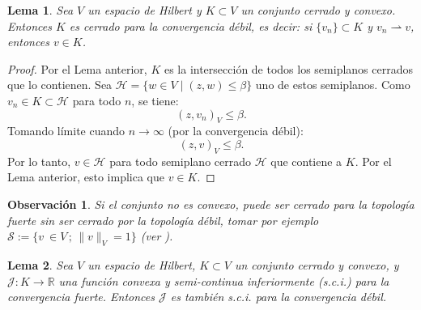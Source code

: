 \documentclass[12pt]{book}
\newtheorem{lemma}{Lema}
\newtheorem{remark}{Observación}
\theoremstyle{definition}
\theoremstyle{plain}
\theoremstyle{remark}
\begin{document}
%

\begin{lemma}
    Sea \(V\) un espacio de Hilbert y \(K \subset V\) un conjunto cerrado y convexo. Entonces \(K\) es cerrado para la convergencia débil, es decir:
    si \(\{v_n\} \subset K\) y \(v_n \rightharpoonup v\), entonces \(v \in K\).
\end{lemma}

\begin{proof}
Por el Lema anterior, \(K\) es la intersección de todos los semiplanos cerrados que lo contienen. Sea \(\mathcal{H} = \{ w \in V \mid (z,w) \leq \beta \}\) uno de estos semiplanos. Como \(v_n \in K \subset \mathcal{H}\) para todo \(n\), se tiene:
  \[
  ( z , v_n )_V \leq \beta.
  \]
  Tomando límite cuando \(n \to \infty\) (por la convergencia débil):
  \[
    ( z , v )_V
 \leq \beta.
  \]
  Por lo tanto, \(v \in \mathcal{H}\) para todo semiplano cerrado \(\mathcal{H}\) que contiene a \(K\). Por el Lema anterior, esto implica que \(v \in K\).
\end{proof}

\begin{remark}
Si el conjunto no es convexo, puede ser cerrado para la topología fuerte sin ser cerrado por la topología débil, tomar por ejemplo $\mathcal{S} := \{ v\ \in V \,;\, \| v \|_V = 1\}$ (ver \cite{brezis2011}).
\end{remark}











\begin{lemma}
    Sea \(V\) un espacio de Hilbert, \(K \subset V\) un conjunto cerrado y convexo, y \(\mathcal{J}: K \to \mathbb{R}\) una función convexa y semi-continua inferiormente (s.c.i.) para la convergencia fuerte. Entonces \(\mathcal{J}\) es también s.c.i. para la convergencia débil.
\end{lemma}
\end{document}
